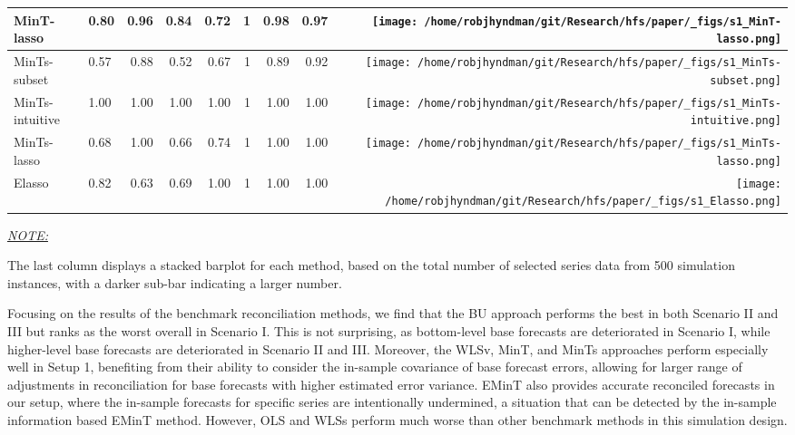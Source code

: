 \documentclass[
  12pt,
  11pt]{article}
\begin{document}
\begin{table}[!h]
\begin{threeparttable}
\begin{tabular}{llrrrrrr>{}r}
MinT-lasso & 0.80 & 0.96 & 0.84 & 0.72 & 1 & 0.98 & 0.97 & \texttt{[image: /home/robjhyndman/git/Research/hfs/paper/\_figs/s1\_MinT-lasso.png]}\\
\midrule
MinTs-subset & 0.57 & 0.88 & 0.52 & 0.67 & 1 & 0.89 & 0.92 & \texttt{[image: /home/robjhyndman/git/Research/hfs/paper/\_figs/s1\_MinTs-subset.png]}\\
MinTs-intuitive & 1.00 & 1.00 & 1.00 & 1.00 & 1 & 1.00 & 1.00 & \texttt{[image: /home/robjhyndman/git/Research/hfs/paper/\_figs/s1\_MinTs-intuitive.png]}\\
MinTs-lasso & 0.68 & 1.00 & 0.66 & 0.74 & 1 & 1.00 & 1.00 & \texttt{[image: /home/robjhyndman/git/Research/hfs/paper/\_figs/s1\_MinTs-lasso.png]}\\
\midrule
Elasso & 0.82 & 0.63 & 0.69 & 1.00 & 1 & 1.00 & 1.00 & \texttt{[image: /home/robjhyndman/git/Research/hfs/paper/\_figs/s1\_Elasso.png]}\\
\bottomrule
\end{tabular}
\begin{tablenotes}[para]
\item \underline{\textit{NOTE:}} 
\item The last column displays a stacked barplot for each method, based on the total number of selected series data from 500 simulation instances, with a darker sub-bar indicating a larger number.
\end{tablenotes}
\end{threeparttable}
\endgroup{}
\end{table}

Focusing on the results of the benchmark reconciliation methods, we find
that the BU approach performs the best in both Scenario II and III but
ranks as the worst overall in Scenario I. This is not surprising, as
bottom-level base forecasts are deteriorated in Scenario I, while
higher-level base forecasts are deteriorated in Scenario II and III.
Moreover, the WLSv, MinT, and MinTs approaches perform especially well
in Setup 1, benefiting from their ability to consider the in-sample
covariance of base forecast errors, allowing for larger range of
adjustments in reconciliation for base forecasts with higher estimated
error variance. EMinT also provides accurate reconciled forecasts in our
setup, where the in-sample forecasts for specific series are
intentionally undermined, a situation that can be detected by the
in-sample information based EMinT method. However, OLS and WLSs perform
much worse than other benchmark methods in this simulation design.
\end{document}

